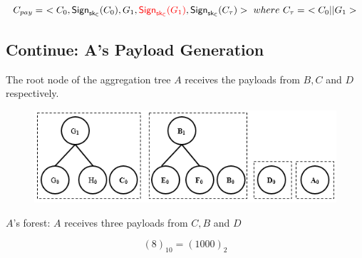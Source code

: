 \documentclass[%
  slidesonly,%
  semlayer%
  ]{seminar}                                  %
\newcommand{\sk}{\sf{sk}}
\begin{document}
\begin{slide}
      \begin{tiny}
        \begin{equation*}
          \begin{array}{l}
            C_{pay} =\ <C_{0},\textsf{Sign}_{\sk_{C}}(C_{0}),G_{1},\textcolor{red}{\textsf{Sign}_{\sk_{C}}(G_{1})}, \textsf{Sign}_{\sk_{C}}(C_{\tau})>\ where\ C_{\tau} =\ <C_{0} || G_{1}>\\
          \end{array}
        \end{equation*}
      \end{tiny}

      \vfill
      \clearpage

    \subsection*{Continue: A's Payload Generation}  

      The root node of the aggregation tree $A$ receives the payloads from $B,C$ and $D$ respectively.
      
      \begin{figure}[h!]
        \centering
        \includegraphics[scale = 0.5]{images/a-forest.png}
      \end{figure}
      \begin{center}
      \begin{small}
        \center
        $A$'s forest: $A$ receives three payloads from $C,B$ and $D$
      \end{small}
      \end{center}
      \begin{equation*}
        (8)_{10} = (1000)_{2}
      \end{equation*}
      \vfill
      \clearpage


\end{slide}
\end{document}
